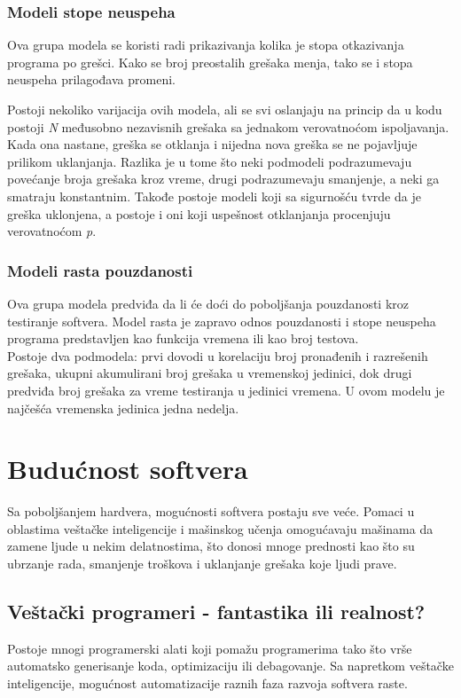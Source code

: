 \documentclass[a4paper]{article}
\begin{document}
\subsubsection{Modeli stope neuspeha}
\label{subsec:stopa_neuspeha}

Ova grupa modela se koristi radi prikazivanja kolika je stopa otkazivanja programa po grešci. Kako se broj preostalih grešaka menja, tako se i stopa neuspeha prilagođava promeni.

Postoji nekoliko varijacija ovih modela, ali se svi oslanjaju na princip da u kodu postoji \textit{N} međusobno nezavisnih grešaka sa jednakom verovatnoćom ispoljavanja. Kada ona nastane, greška se otklanja i nijedna nova greška se ne pojavljuje prilikom uklanjanja.
Razlika je u tome što neki podmodeli podrazumevaju povećanje broja grešaka kroz vreme, drugi podrazumevaju smanjenje, a neki ga smatraju konstantnim. Takođe postoje modeli koji sa sigurnošću tvrde da je greška uklonjena, a postoje i oni koji uspešnost otklanjanja procenjuju verovatnoćom \textit{p}.

\subsubsection{Modeli rasta pouzdanosti}
\label{subsec:rast_pouzdanosti}

Ova grupa modela predviđa da li će doći do poboljšanja pouzdanosti kroz testiranje softvera. Model rasta je zapravo odnos pouzdanosti i stope neuspeha programa predstavljen kao funkcija vremena ili kao broj testova.\\
Postoje dva podmodela: prvi dovodi u korelaciju broj pronađenih i razrešenih grešaka, ukupni akumulirani broj grešaka u vremenskoj jedinici, dok drugi predviđa broj grešaka za vreme testiranja u jedinici vremena. U ovom modelu je najčešća vremenska jedinica jedna nedelja.


\section{Budućnost softvera}
\label{sec:buducnost}

Sa poboljšanjem hardvera, mogućnosti softvera postaju sve veće. Pomaci u oblastima veštačke inteligencije i mašinskog učenja omogućavaju mašinama da zamene ljude u nekim delatnostima, što donosi mnoge prednosti kao što su ubrzanje rada, smanjenje troškova i uklanjanje grešaka koje ljudi prave.

\subsection{Veštački programeri - fantastika ili realnost?}
Postoje mnogi programerski alati koji pomažu programerima tako što vrše automatsko generisanje koda, optimizaciju  ili debagovanje.
Sa napretkom veštačke inteligencije, mogućnost automatizacije raznih faza razvoja softvera raste.
\end{document}

